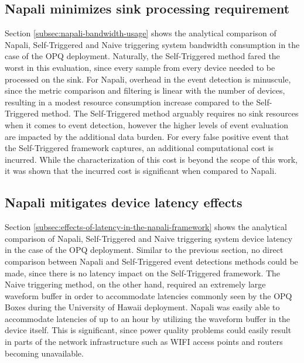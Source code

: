 \subsection{Napali minimizes sink processing requirement}\label{subsec:conc:napali-minimizes-sink-processing-requirement}
Section \ref{subsec:napali-bandwidth-usage} shows the analytical comparison of Napali, Self-Triggered and Naive triggering system bandwidth consumption in the case of the OPQ deployment.
Naturally, the Self-Triggered method fared the worst in this evaluation, since every sample from every device needed to be processed on the sink.
For Napali, overhead in the event detection is minuscule, since the metric comparison and filtering is linear with the number of devices,
resulting in a modest resource consumption increase compared to the Self-Triggered method.
The Self-Triggered method arguably requires no sink resources when it comes to event detection, however the higher levels of event evaluation are impacted by the additional data burden.
For every false positive event that the Self-Triggered framework captures, an additional computational cost is incurred.
While the characterization of this cost is beyond the scope of this work, it was shown that the incurred cost is significant when compared to Napali.

\subsection{Napali mitigates device latency effects}\label{subsec:conc:napali-mitigates-device-latency-effects}
Section \ref{subsec:effects-of-latency-in-the-napali-framework} shows the analytical comparison of Napali, Self-Triggered and Naive triggering system device latency in the case of the OPQ deployment.
Similar to the previous section, no direct comparison between Napali and Self-Triggered event detections methods could be made, since there is no latency impact on the Self-Triggered framework.
The Naive triggering method, on the other hand, required an extremely large waveform buffer in order to accommodate latencies commonly seen by the OPQ Boxes during the University of Hawaii deployment.
Napali was easily able to accommodate latencies of up to an hour by utilizing the waveform buffer in the device itself.
This is significant, since power quality problems could easily result in parts of the network infrastructure such as WIFI access points and routers becoming unavailable.


